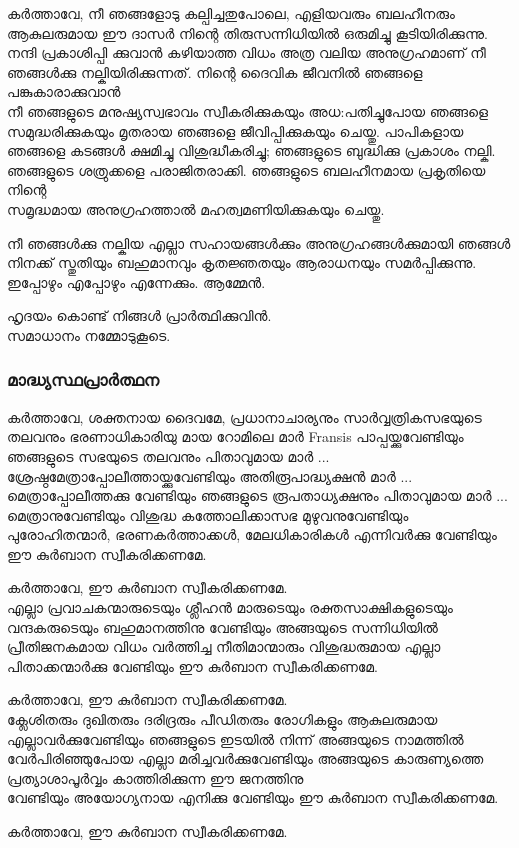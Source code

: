 \documentclass[20pt]{beamer}
\newcommand{\Priest}[1]{\color{white}#1}
\newcommand{\People}[1]{\color{yellow}#1}
\newcommand{\Server}[1]{\color{lightgray}#1}
\newcommand{\Ammen}{\People{ആമ്മേന്‍.}}
\newcommand{\Peace}{\Server{സമാധാനം നമ്മോടുകൂടെ.}}
\begin{document}
\begin{frame}[allowframebreaks]
\Priest{
കര്‍ത്താവേ, നീ ഞങ്ങളോടു കല്പിച്ചതുപോലെ, എളിയവരും 
ബലഹീനരും ആകുലരുമായ ഈ ദാസര്‍ നിന്റെ തിരുസന്നിധിയില്‍ 
ഒരുമിച്ചു കൂടിയിരിക്കുന്നു. നന്ദി പ്രകാശിപ്പി ക്കുവാന്‍ കഴിയാത്ത വിധം അത്ര 
വലിയ അനുഗ്രഹമാണ് നീ ഞങ്ങള്‍ക്കു നല്കിയിരിക്കുന്നത്. നിന്റെ 
ദൈവിക ജീവനില്‍ ഞങ്ങളെ പങ്കുകാരാക്കുവാന്‍  \\ \framebreak 
നീ ഞങ്ങളുടെ മനുഷ്യസ്വഭാവം സ്വീകരിക്കുകയും അധ:പതിച്ചുപോയ ഞങ്ങളെ 
സമുദ്ധരിക്കുകയും മൃതരായ ഞങ്ങളെ ജീവിപ്പിക്കുകയും ചെയ്തു. 
പാപികളായ ഞങ്ങളെ കടങ്ങള്‍ ക്ഷമിച്ചു വിശുദ്ധീകരിച്ചു; 
ഞങ്ങളുടെ ബുദ്ധിക്കു പ്രകാശം നല്കി. ഞങ്ങളുടെ ശത്രുക്കളെ 
പരാജിതരാക്കി. ഞങ്ങളുടെ ബലഹീനമായ പ്രകൃതിയെ നിന്റെ \\ \framebreak
സമൃദ്ധമായ അനുഗ്രഹത്താല്‍ മഹത്വമണിയിക്കുകയും ചെയ്തു.

നീ ഞങ്ങള്‍ക്കു നല്കിയ എല്ലാ സഹായങ്ങള്‍ക്കും അനുഗ്രഹങ്ങള്‍ക്കുമായി 
ഞങ്ങള്‍ നിനക്ക് സ്തുതിയും ബഹുമാനവും കൃതജ്ഞതയും ആരാധനയും 
സമര്‍പ്പിക്കുന്നു. ഇപ്പോഴും എപ്പോഴും എന്നേക്കും.}
\Ammen
\end{frame}

\begin{frame}
\Server{ഹൃദയം കൊണ്ട് നിങ്ങള്‍ പ്രാര്‍ത്ഥിക്കുവിന്‍.\\ \Peace}
\end{frame}

\begin{frame}[allowframebreaks]
\frametitle{മാദ്ധ്യസ്ഥപ്രാര്‍ത്ഥന}
\Priest{
കര്‍ത്താവേ, ശക്തനായ ദൈവമേ, പ്രധാനാചാര്യനും സാര്‍വ്വത്രികസഭയുടെ 
തലവനും ഭരണാധികാരിയു മായ റോമിലെ മാര്‍ Fransis പാപ്പയ്ക്കുവേണ്ടിയും 
ഞങ്ങളുടെ സഭയുടെ തലവനും പിതാവുമായ മാര്‍ ... 
ശ്രേഷ്ഠമേത്രാപ്പോലീത്തായ്ക്കുവേണ്ടിയും അതിരൂപാദ്ധ്യക്ഷന്‍ മാര്‍ ... 
മെത്രാപ്പോലീത്തക്കു വേണ്ടിയും ഞങ്ങളുടെ രൂപതാധ്യക്ഷനും പിതാവുമായ 
മാര്‍ ... മെത്രാനുവേണ്ടിയും വിശുദ്ധ കത്തോലിക്കാസഭ മുഴുവനുവേണ്ടിയും 
പുരോഹിതന്മാര്‍, ഭരണകര്‍ത്താക്കള്‍, മേലധികാരികള്‍ എന്നിവര്‍ക്കു 
വേണ്ടിയും ഈ കുര്‍ബാന സ്വീകരിക്കണമേ.}\par
\People{കര്‍ത്താവേ, ഈ കുര്‍ബാന സ്വീകരിക്കണമേ.}\\ \framebreak
\Priest{
എല്ലാ പ്രവാചകന്മാരുടെയും ശ്ലീഹന്‍ മാരുടെയും രക്തസാക്ഷികളുടെയും 
വന്ദകരുടെയും ബഹുമാനത്തിനു വേണ്ടിയും അങ്ങയുടെ സന്നിധിയില്‍ 
പ്രീതിജനകമായ വിധം വര്‍ത്തിച്ച നീതിമാന്മാരും വിശുദ്ധരുമായ എല്ലാ 
പിതാക്കന്മാര്‍ക്കു വേണ്ടിയും ഈ കുര്‍ബാന സ്വീകരിക്കണമേ.}\par
\People{കര്‍ത്താവേ, ഈ കുര്‍ബാന സ്വീകരിക്കണമേ.}\\ \framebreak
\Priest{
ക്ലേശിതരും ദുഖിതരും ദരിദ്രരും പീഡിതരും രോഗികളും ആകുലരുമായ 
എല്ലാവര്‍ക്കുവേണ്ടിയും ഞങ്ങളുടെ ഇടയില്‍ നിന്ന് അങ്ങയുടെ നാമത്തില്‍ 
വേര്‍പിരിഞ്ഞുപോയ എല്ലാ മരിച്ചവര്‍ക്കുവേണ്ടിയും  അങ്ങയുടെ കാരുണ്യത്തെ 
പ്രത്യാശാപൂര്‍വ്വം കാത്തിരിക്കുന്ന ഈ ജനത്തിനു  \\ \framebreak
വേണ്ടിയും അയോഗ്യനായ എനിക്കു വേണ്ടിയും ഈ കുര്‍ബാന സ്വീകരിക്കണമേ.}\par
\People{കര്‍ത്താവേ, ഈ കുര്‍ബാന സ്വീകരിക്കണമേ.}\\
\end{frame}
\end{document}
